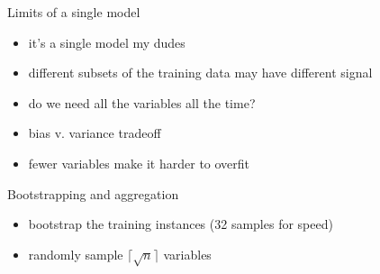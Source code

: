 \documentclass[12pt, smalloffset, compress, aspectratio=1610]{beamer}
\providecommand{\tightlist}{%
  \setlength{\itemsep}{0pt}\setlength{\parskip}{0pt}}
\begin{document}
\begin{frame}{Limits of a single model}
\label{limits-of-a-single-model}
\begin{itemize}
\tightlist
\item
  it's a single model my dudes
\item
  different subsets of the training data may have different signal
\item
  do we need all the variables all the time?
\item
  bias v. variance tradeoff
\item
  fewer variables make it harder to overfit
\end{itemize}
\end{frame}

\begin{frame}{Bootstrapping and aggregation}
\label{bootstrapping-and-aggregation}
\begin{itemize}
\tightlist
\item
  bootstrap the training \alert{instances} (32 samples for speed)
\item
  randomly sample \(\lceil \sqrt{n} \rceil\) variables
\end{itemize}
\end{frame}
\end{document}
